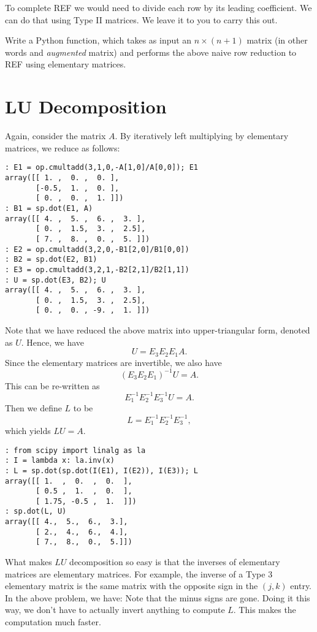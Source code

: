 To complete REF we would need to divide each row by its leading
coefficient.  We can do that using Type II matrices.  We leave it to
you to carry this out.

\begin{problem}
\label{prob:REF}
Write a Python function, which takes as input an
$n\times (n+1)$ matrix (in other words and \emph{augmented} matrix) and performs the above naive row reduction to REF using elementary matrices.
\end{problem}

\section*{LU Decomposition}

Again, consider the matrix $A$. By iteratively left multiplying by
elementary matrices, we reduce as follows:

\begin{lstlisting}[style=python]
: E1 = op.cmultadd(3,1,0,-A[1,0]/A[0,0]); E1
array([[ 1. ,  0. ,  0. ],
       [-0.5,  1. ,  0. ],
       [ 0. ,  0. ,  1. ]])
: B1 = sp.dot(E1, A)
array([[ 4. ,  5. ,  6. ,  3. ],
       [ 0. ,  1.5,  3. ,  2.5],
       [ 7. ,  8. ,  0. ,  5. ]])
: E2 = op.cmultadd(3,2,0,-B1[2,0]/B1[0,0])
: B2 = sp.dot(E2, B1)
: E3 = op.cmultadd(3,2,1,-B2[2,1]/B2[1,1])
: U = sp.dot(E3, B2); U
array([[ 4. ,  5. ,  6. ,  3. ],
       [ 0. ,  1.5,  3. ,  2.5],
       [ 0. ,  0. , -9. ,  1. ]])
\end{lstlisting}
Note that we have reduced the above matrix into upper-triangular
form, denoted as $U$.  Hence, we have
\[
U = E_3 E_2 E_1 A.
\]
Since the elementary matrices are invertible, we also have
\[
(E_3 E_2 E_1)^{-1} U =  A.
\]
This can be re-written as
\[
E_1^{-1} E_2^{-1} E_3^{-1} U =  A.
\]
Then we define $L$ to be
\[
L = E_1^{-1} E_2^{-1} E_3^{-1},
\]
which yields $L U = A$.  
\begin{lstlisting}[style=python]
: from scipy import linalg as la
: I = lambda x: la.inv(x)
: L = sp.dot(sp.dot(I(E1), I(E2)), I(E3)); L
array([[ 1.  ,  0.  ,  0.  ],
       [ 0.5 ,  1.  ,  0.  ],
       [ 1.75, -0.5 ,  1.  ]])
: sp.dot(L, U)
array([[ 4.,  5.,  6.,  3.],
       [ 2.,  4.,  6.,  4.],
       [ 7.,  8.,  0.,  5.]])
\end{lstlisting}
What makes $LU$ decomposition so easy is that the inverses of
elementary matrices are elementary matrices.  For example, the
inverse of a Type 3 elementary matrix is the same matrix with the
opposite sign in the $(j,k)$ entry.  In the above problem, we have:
Note that the minus signs are gone.  Doing it this way, we don't
have to actually invert anything to compute $L$.  This makes the
computation much faster.

